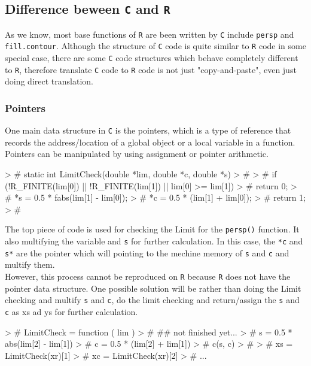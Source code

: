 \documentclass[paper=a4, fontsize=11pt]{report}
\begin{document}
\subsection{Difference beween \texttt{C} and \texttt{R}}
As we know, most base functions of \texttt{R} are been written by \texttt{C} include \texttt{persp} and \texttt{fill.contour}. Although the structure of \texttt{C} code is quite similar to \texttt{R} code in some special case, there are some \texttt{C} code structures which behave completely different to \texttt{R}, therefore translate \texttt{C} code to \texttt{R} code is not just "copy-and-paste", even just doing direct translation.\\

\subsubsection{Pointers}
One main data structure in \texttt{C} is the pointers, which is a type of reference that records the address/location of a global object or a local variable in a function. Pointers can be manipulated by using assignment or pointer arithmetic.
\begin{Schunk}
\begin{Sinput}
> # static int LimitCheck(double *lim, double *c, double *s)
> # {
> #     if (!R_FINITE(lim[0]) || !R_FINITE(lim[1]) || lim[0] >= lim[1])
> # 	return 0;
> #     *s = 0.5 * fabs(lim[1] - lim[0]);
> #     *c = 0.5 * (lim[1] + lim[0]);
> #     return 1;
> # }
\end{Sinput}
\end{Schunk}
The top piece of code is used for checking the Limit for the \texttt{persp()} function. It also multifying the variable  and \texttt{s} for further calculation. In this case, the \texttt{*c} and \texttt{s*} are the pointer which will pointing to the mechine memory of \texttt{s} and \texttt{c} and multify them.\\

However, this process cannot be reproduced on \texttt{R} because \texttt{R} does not have the pointer data structure. One possible solution will be rather than doing the Limit checking and multify \texttt{s} and \texttt{c}, do the limit checking and return/assign the \texttt{s} and \texttt{c} as xs ad ys for further calculation.
\begin{Schunk}
\begin{Sinput}
> # LimitCheck = function ( lim ) {
> #     ## not finished yet...
> #     s = 0.5 * abs(lim[2] - lim[1])
> #     c = 0.5 * (lim[2] + lim[1])
> #     c(s, c)
> # }
> # xs = LimitCheck(xr)[1]
> # xc = LimitCheck(xr)[2]
> # ...
\end{Sinput}
\end{Schunk}
\end{document}
